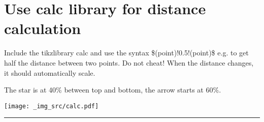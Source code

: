 \documentclass[12pt]{article}
\begin{document}
\section{Use calc library for distance calculation}

Include the tikzlibrary calc and use the syntax \$(point)!0.5!(point)\$ e.g. to get half
the distance between two points.
Do not cheat! When the distance changes, it should automatically scale.

\noindent The star is at 40\% between top and bottom, the arrow starts at 60\%.
\vspace{1em}

\texttt{[image: \_img\_src/calc.pdf]}

\vspace{1em}
\hrule 
\vspace{1em}

\end{document}
